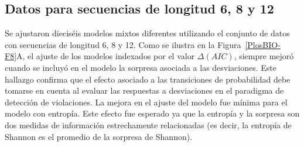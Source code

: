 \subsection{Datos para secuencias de longitud 6, 8 y 12}


Se ajustaron dieciséis modelos mixtos diferentes utilizando el conjunto de datos con secuencias de longitud 6, 8 y 12. Como se ilustra en la Figura~\ref{PlosBIO-F8}A, el ajuste de los modelos indexados por el valor $\Delta (AIC)$, siempre mejoró cuando se incluyó en el modelo la sorpresa asociada a las desviaciones. Este hallazgo confirma que el efecto asociado a las transiciones de probabilidad debe tomarse en cuenta al evaluar las respuestas a desviaciones en el paradigma de detección de violaciones. La mejora en el ajuste del modelo fue mínima para el modelo con entropía. Este efecto fue esperado ya que la entropía y la sorpresa son dos medidas de información estrechamente relacionadas (es decir, la entropía de Shannon es el promedio de la sorpresa de Shannon).


